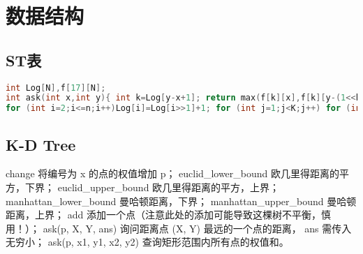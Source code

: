 \documentclass[landscape,a4paper]{article}
\begin{document}
\section{数据结构}
\subsection{ST表}
\begin{lstlisting}[language=C++]
int Log[N],f[17][N];
int ask(int x,int y){ int k=Log[y-x+1]; return max(f[k][x],f[k][y-(1<<k)+1]); }
for (int i=2;i<=n;i++)Log[i]=Log[i>>1]+1; for (int j=1;j<K;j++) for (int i=1;i+(1<<j-1)<=n;i++) f[j][i]=max(f[j-1][i],f[j-1][i+(1<<j-1)]);
\end{lstlisting}

\subsection{K-D Tree}

 change 将编号为 x 的点的权值增加 p；
 euclid\_lower\_bound 欧几里得距离的平方，下界；
 euclid\_upper\_bound 欧几里得距离的平方，上界；
 manhattan\_lower\_bound 曼哈顿距离，下界；
 manhattan\_upper\_bound 曼哈顿距离，上界；
 add 添加一个点（注意此处的添加可能导致这棵树不平衡，慎用！）；
 ask(p, X, Y, ans) 询问距离点 (X, Y) 最远的一个点的距离， ans 需传入无穷小；
 ask(p, x1, y1, x2, y2) 查询矩形范围内所有点的权值和。
\end{document}
